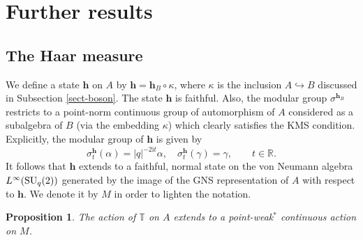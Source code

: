 \documentclass[12pt,reqno,a4paper]{amsart}
\newtheorem{proposition}{Proposition}[section]
\theoremstyle{definition}
\newcommand{\comp}{\circ}
\newcommand{\ii}{\mathrm{i}}
\newcommand{\RR}{\mathbb{R}}
\newcommand{\TT}{\mathbb{T}}
\newcommand{\bh}{{\boldsymbol{h}}}
\DeclareMathOperator{\Linf}{\mathnormal{L}^{\infty}}
\newcommand{\SU}{\mathrm{SU}}
\newcommand{\kmap}{\kappa}
\numberwithin{equation}{section}
\begin{document}
\section{Further results}

\subsection{The Haar measure}\label{sect-HaarMeasure}

We define a state $\bh$ on $A$ by $\bh=\bh_B\comp\kmap$, where $\kmap$ is the inclusion $A\hookrightarrow B$ discussed in Subsection \ref{sect-boson}. The state $\bh$ is faithful. Also, the modular group $\sigma^{\bh_B}$ restricts to a point-norm continuous group of automorphism of $A$ considered as a subalgebra of $B$ (via the embedding $\kmap$) which clearly satisfies the KMS condition. Explicitly, the modular group of $\bh$ is given by
\[
\sigma^{\bh}_t(\alpha)=|q|^{-2\ii t}\alpha,\quad
\sigma^{\bh}_t(\gamma)=\gamma
,\qquad t\in\RR.
\]
It follows that $\bh$ extends to a faithful, normal state on the von Neumann algebra $\Linf(\SU_q(2))$ generated by the image of the GNS representation of $A$ with respect to $\bh$. We denote it by $M$ in order to lighten the notation.

\begin{proposition}
The action of $\TT$ on $A$ extends to a point-weak${}^*$ continuous action on $M$.
\end{proposition}
\end{document}
